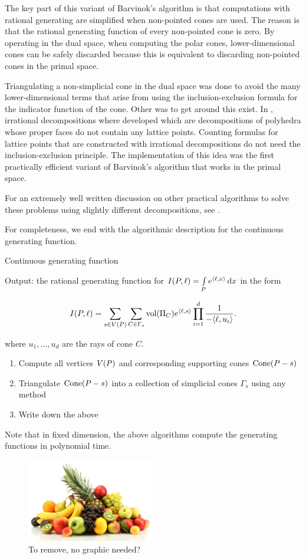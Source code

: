 The key part of this variant of Barvinok's algorithm is that computations with rational generating are simplified when non-pointed cones are used. The reason is that the rational generating
function of every non-pointed cone is zero. By operating in the dual space, when computing the polar cones, lower-dimensional cones can be safely discarded because this is equivalent to discarding non-pointed cones in the primal space. 

Triangulating a non-simplicial cone in the dual space was done to avoid the many lower-dimensional terms that arise from using the inclusion-exclusion formula for the indicator function of the cone. Other was to get around this exist. In \cite{koeppe:irrational-barvinok, beck-sottile:irrational, beck-haase-sottile:theorema}, irrational decompositions where developed which are decompositions of polyhedra whose proper faces do not contain any lattice points. Counting formulas for lattice points that are constructed with irrational decompositions do not need the inclusion-exclusion principle. The implementation of this idea \cite{latte-macchiato} was the first practically efficient variant of Barvinok’s algorithm that works in the primal space.


For an extremely well written discussion on other practical algorithms to solve these problems using slightly different decompositions, see \cite{koeppe:irrational-barvinok}. 


For completeness, we end with the algorithmic description for the continuous generating function. 

\begin{algorithm}
\caption{Continuous generating function}

\begin{justify}
Output: the rational generating function for $I({ P}, \ell) = \int\limits_{{ P}} e^{\langle \ell, x \rangle}\,\mathrm{d} x$ in the form

\[ I({ P},\ell) = \sum_{s \in V({ P})} \sum_{C \in \Gamma_s} \text{vol} (\Pi_C)e^{{\langle} \ell, s {\rangle}} \prod_{i=1}^d \frac{1}{-{\langle} \ell, u_i {\rangle}}. \]

where $u_1, \dots, u_d$ are the rays of cone $C$.
\end{justify}
\begin{enumerate}
\item  Compute all vertices $V({ P})$ and corresponding supporting cones $\operatorname{Cone}({ P} - s)$
\item Triangulate $\operatorname{Cone}({ P} - s)$ into a collection of simplicial cones $\Gamma_s$ using any method
\item Write down the above
\end{enumerate}
\end{algorithm} 
 

Note that in fixed dimension, the above algorithms compute the generating functions in polynomial time. 
   
   
   \begin{figure}[h!]
  \caption{To remove, no graphic needed?}
  \centering
    \includegraphics[width=0.5\textwidth]{figures/fruit.jpg}
\end{figure}
   
